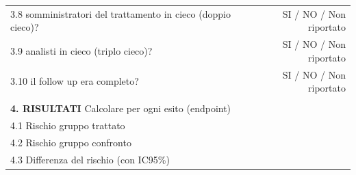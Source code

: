 \documentclass[]{book}
\begin{document}
\begin{longtable}[]{@{}lr@{}}
\begin{minipage}[t]{0.47\columnwidth}
3.8 somministratori del trattamento in cieco (doppio cieco)?\strut
\end{minipage} & \begin{minipage}[t]{0.47\columnwidth}\raggedleft
SI / NO / Non riportato\strut
\end{minipage}\tabularnewline
\begin{minipage}[t]{0.47\columnwidth}\raggedright
3.9 analisti in cieco (triplo cieco)?\strut
\end{minipage} & \begin{minipage}[t]{0.47\columnwidth}\raggedleft
SI / NO / Non riportato\strut
\end{minipage}\tabularnewline
\begin{minipage}[t]{0.47\columnwidth}\raggedright
3.10 il follow up era completo?\strut
\end{minipage} & \begin{minipage}[t]{0.47\columnwidth}\raggedleft
SI / NO / Non riportato\strut
\end{minipage}\tabularnewline
\begin{minipage}[t]{0.47\columnwidth}\raggedright
\strut
\end{minipage} & \begin{minipage}[t]{0.47\columnwidth}\raggedleft
\strut
\end{minipage}\tabularnewline
\begin{minipage}[t]{0.47\columnwidth}\raggedright
\textbf{4. RISULTATI} Calcolare per ogni esito (endpoint)\strut
\end{minipage} & \begin{minipage}[t]{0.47\columnwidth}\raggedleft
\strut
\end{minipage}\tabularnewline
\begin{minipage}[t]{0.47\columnwidth}\raggedright
4.1 Rischio gruppo trattato\strut
\end{minipage} & \begin{minipage}[t]{0.47\columnwidth}\raggedleft
\strut
\end{minipage}\tabularnewline
\begin{minipage}[t]{0.47\columnwidth}\raggedright
4.2 Rischio gruppo confronto\strut
\end{minipage} & \begin{minipage}[t]{0.47\columnwidth}\raggedleft
\strut
\end{minipage}\tabularnewline
\begin{minipage}[t]{0.47\columnwidth}\raggedright
4.3 Differenza del rischio (con IC95\%)\strut
\end{minipage} & \begin{minipage}[t]{0.47\columnwidth}\raggedleft

\end{minipage}
\end{longtable}
\end{document}
